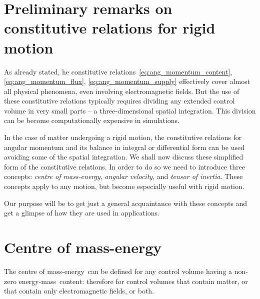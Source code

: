 \documentclass[a4paper,12pt,%
onecolumn,oneside,%
british%
]{memoir}
\renewcommand*{\|}[1][]{\nonscript\:#1\vert\nonscript\:\mathopen{}}
\newcommand*{\energym}{energy-mass}
\newcommand*{\masse}{mass-energy}
\begin{document}
\section{Preliminary remarks on constitutive relations for rigid motion}
\label{sec:prelim_rigidbody}

As already stated, he constitutive relations~\eqref{eq:ang_momentum_content}, \eqref{eq:ang_momentum_flux}, \eqref{eq:ang_momentum_supply} effectively cover almost all physical phenomena, even involving electromagnetic fields. But the use of these constitutive relations typically requires dividing any extended control volume in very small parts -- a three-dimensional spatial integration. This division can be become computationally expensive in simulations.

In the case of matter undergoing a rigid motion, the constitutive relations for angular momentum and its balance in integral or differential form can be used avoiding some of the spatial integration. We shall now discuss these simplified form of the constitutive relations. In order to do so we need to introduce three concepts: \emph{centre of \masse}, \emph{angular velocity}, and \emph{tensor of inertia}. These concepts apply to any motion, but become especially useful with rigid motion.

Our purpose will be to get just a general acquaintance with these concepts and get a glimpse of how they are used in applications.

\section{Centre of \masse}
\label{sec:centre_mass}

The centre of \masse\ can be defined for any control volume having a non-zero \energym\ content: therefore for control volumes that contain matter, or that contain only electromagnetic fields, or both.
\end{document}
